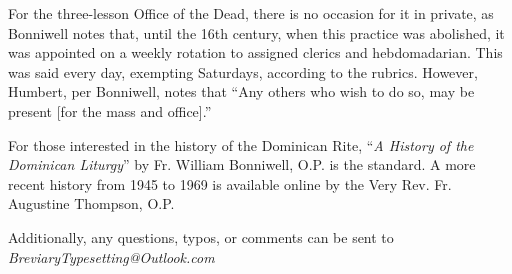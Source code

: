 For the three-lesson Office of the Dead, there is no occasion for it in private, as Bonniwell notes that, until the 16th century, when this practice was abolished, it was appointed on a weekly rotation to assigned clerics and hebdomadarian. This was said every day, exempting Saturdays, according to the rubrics. However, Humbert, per Bonniwell, notes that ``Any others who wish to do so, may be present [for the mass and office].''


{\color{Red} }

For those interested in the history of the Dominican Rite, ``\emph{A History of the Dominican Liturgy}'' by Fr. William Bonniwell, O.P. is the standard. A more recent history from 1945 to 1969 is available online by the Very Rev. Fr. Augustine Thompson, O.P.

Additionally, any questions, typos, or comments can be sent to \emph{BreviaryTypesetting@Outlook.com}



